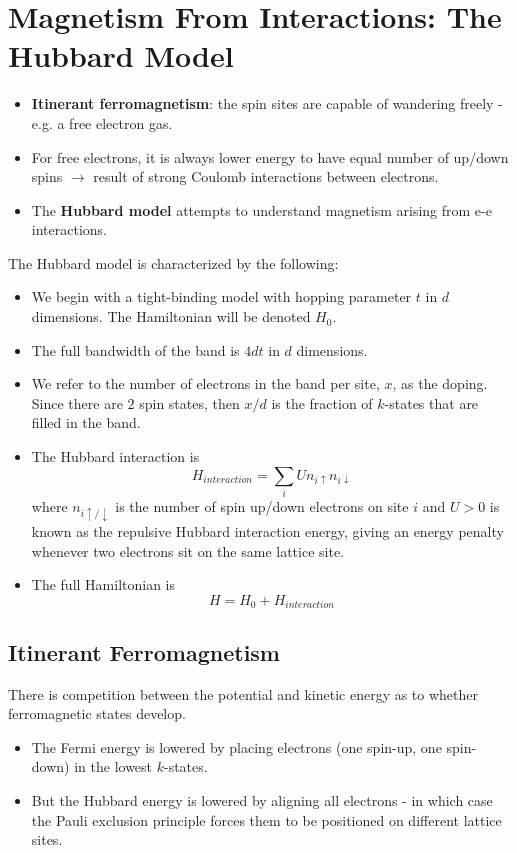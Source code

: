\documentclass[10pt]{article}
\begin{document}
\section{Magnetism From Interactions: The Hubbard Model}
\begin{itemize}
  \item \textbf{Itinerant ferromagnetism}: the spin sites are capable of wandering freely - e.g. a free electron gas.
  \item For free electrons, it is always lower energy to have equal number of up/down spins $\rightarrow$ result of strong Coulomb interactions
  between electrons.
  \item The \textbf{Hubbard model} attempts to understand magnetism arising from e-e interactions.
\end{itemize}
The Hubbard model is characterized by the following:
\begin{itemize}
  \item We begin with a tight-binding model with hopping parameter $t$ in $d$ dimensions. The Hamiltonian will
  be denoted $H_{0}$.
  \item The full bandwidth of the band is $4dt$ in $d$ dimensions.
  \item We refer to the number of electrons in the band per site, $x$, as the doping. Since there are $2$ spin states,
  then $x/d$ is the fraction of $k$-states that are filled in the band.
  \item The Hubbard interaction is
  $$
  H_{interaction} = \sum_{i}U n_{i\uparrow}n_{i\downarrow}
  $$
  where $n_{i\uparrow/\downarrow}$ is the number of spin up/down electrons on site $i$ and $U > 0$ is known as the repulsive Hubbard
  interaction energy, giving an energy penalty whenever two electrons sit on the same lattice site.
  \item The full Hamiltonian is
  $$H = H_{0} + H_{interaction}$$
\end{itemize}

\subsection{Itinerant Ferromagnetism}
There is competition between the potential and kinetic energy as to whether ferromagnetic states develop.
\begin{itemize}
  \item The Fermi energy is lowered by placing electrons (one spin-up, one spin-down) in the lowest $k$-states.
  \item But the Hubbard energy is lowered by aligning all electrons - in which case the Pauli exclusion principle forces them
  to be positioned on different lattice sites.
\end{itemize}
\end{document}
